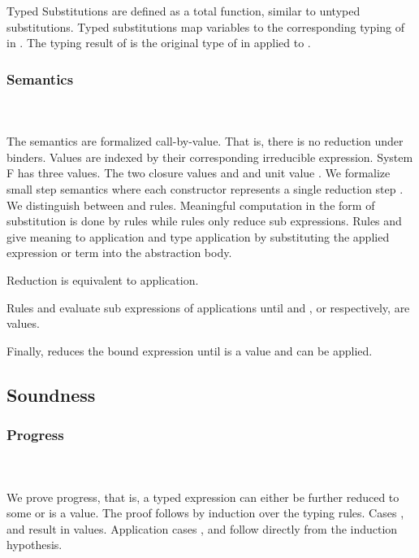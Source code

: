 \noindent Typed Substitutions are defined as a total function, similar to untyped substitutions.
\FSubTyping
Typed substitutions  map variables    to the corresponding typing of  in . The typing result of  is the original type of  in  applied to .
\subsubsection{Semantics}\hfill\\\\
The semantics are formalized call-by-value. That is, there is no reduction under binders. Values are indexed by their corresponding irreducible expression.
\FVal
System F has three values. The two closure values  and  and unit value .
We formalize small step semantics where each constructor represents a single reduction step   .
We distinguish between  and  rules. 
Meaningful computation in the form of substitution is done by  rules while  rules only reduce sub expressions.
\FSemantics
Rules  and  give meaning to application and type application by substituting the applied expression or term into the abstraction body. 

\noindent Reduction  is equivalent to application. 

\noindent  Rules  and  evaluate sub expressions of applications until  and , or  respectively, are values. 

\noindent  Finally,  reduces the bound expression  until  is a value and  can be applied. 

\subsection{Soundness}

\subsubsection{Progress}\hfill\\\\
We prove progress, that is, a typed expression  can either be further reduced to some  or  is a value. The proof follows by induction over the typing rules. 
\FProgress
Cases ,  and  result in values. Application cases ,  and  follow directly from the induction hypothesis. 
